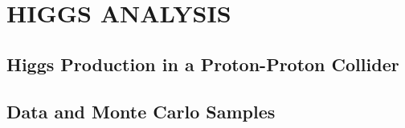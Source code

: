 %
%
%



\chapter{\uppercase {Higgs Analysis}}
\label{ch:analysis}

\section{Higgs Production in a Proton-Proton Collider}
\label{sec:higgs_production}

\section{Data and Monte Carlo Samples}

